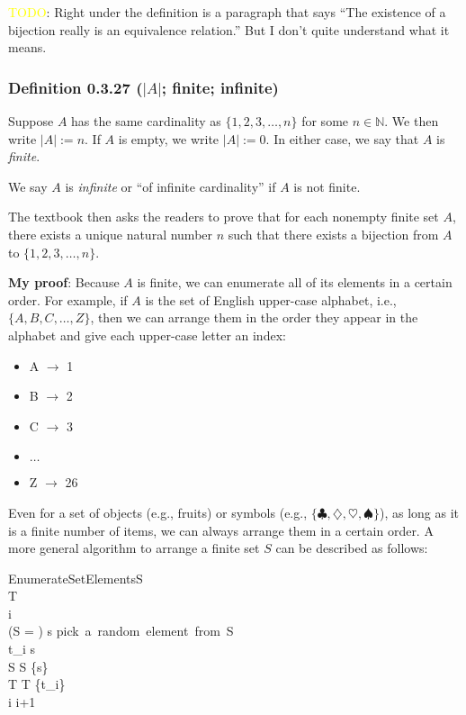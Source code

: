 \documentclass[12pt, letterpaper, oneside]{book}
\begin{document}
\colorbox{red!100}{\textcolor{yellow}{TODO}}: Right under the definition is a
paragraph that says ``The existence of a bijection really is an equivalence
relation.'' But I don't quite understand what it means.

\subsubsection*{Definition 0.3.27 ($|A|$; finite; infinite)}

Suppose $A$ has the same cardinality as $\{1, 2, 3, \ldots , n\}$ for some $n
\in \mathbb{N}$. We then write $|A|:= n$. If $A$ is empty, we write $|A|:= 0$.
In either case, we say that $A$ is \textit{finite}.

We say $A$ is \textit{infinite} or ``of infinite cardinality'' if $A$ is not
finite.

The textbook then asks the readers to prove that for each nonempty finite set
$A$, there exists a unique natural number $n$ such that there exists a bijection
from $A$ to $\{1, 2, 3, \ldots, n\}$.

\colorbox{lime!100}{\textbf{My proof}}: Because $A$ is finite, we can enumerate
all of its elements in a certain order. For example, if $A$ is the set of
English upper-case alphabet, i.e., $\{A, B, C, \ldots, Z\}$, then we can arrange
them in the order they appear in the alphabet and give each upper-case letter an
index:
\begin{itemize}
  \item A $\rightarrow$ 1
  \item B $\rightarrow$ 2
  \item C $\rightarrow$ 3
  \item $\ldots$
  \item Z $\rightarrow$ 26
\end{itemize}

Even for a set of objects (e.g., fruits) or symbols (e.g., $\{\clubsuit,
\diamondsuit, \heartsuit, \spadesuit \}$), as long as it is a finite number of
items, we can always arrange them in a certain order. A more general algorithm
to arrange a finite set $S$ can be described as follows:

\begin{pseudocode}[ruled]{EnumerateSetElements}{S}
   \\
  T \GETS \emptyset \\
  i  \\
  \WHILE \NOT (S = \emptyset) \DO
    \BEGIN
      s \GETS \mbox{pick a random element from S} \\
      t_i \GETS s \\
      S \GETS S \setminus \{s\} \\
      T \GETS T \cup \{t_i\} \\
      i \GETS i+1
    \END \\
\end{pseudocode}
\end{document}
